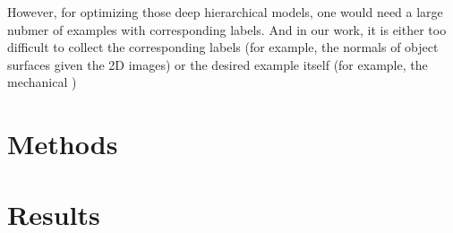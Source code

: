 \documentclass[12pt]{article}
\begin{document}
However, for optimizing those deep hierarchical models, one would need a large nubmer of examples with corresponding labels. And in our work, it is either too difficult to collect the corresponding labels (for example, the normals of object surfaces given the 2D images) or the desired example itself (for example, the mechanical )

\section*{Methods}

\section*{Results}



%
%

\end{document}
